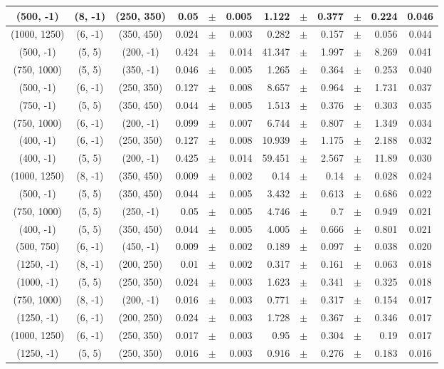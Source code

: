 \documentclass[12pt]{paper}
\begin{document}
\begin{table}[ht]
\begin{center}
{\begin{tabular}{|c|c|c|rrr|rrrrr|c|}
(500, -1)&(8, -1)&(250, 350)&0.05&$\pm$&0.005&1.122&$\pm$&0.377&$\pm$&0.224&0.046\\\hline
(1000, 1250)&(6, -1)&(350, 450)&0.024&$\pm$&0.003&0.282&$\pm$&0.157&$\pm$&0.056&0.044\\\hline
(500, -1)&(5, 5)&(200, -1)&0.424&$\pm$&0.014&41.347&$\pm$&1.997&$\pm$&8.269&0.041\\\hline
(750, 1000)&(5, 5)&(350, -1)&0.046&$\pm$&0.005&1.265&$\pm$&0.364&$\pm$&0.253&0.040\\\hline
(500, -1)&(6, -1)&(250, 350)&0.127&$\pm$&0.008&8.657&$\pm$&0.964&$\pm$&1.731&0.037\\\hline
(750, -1)&(5, 5)&(350, 450)&0.044&$\pm$&0.005&1.513&$\pm$&0.376&$\pm$&0.303&0.035\\\hline
(750, 1000)&(6, -1)&(200, -1)&0.099&$\pm$&0.007&6.744&$\pm$&0.807&$\pm$&1.349&0.034\\\hline
(400, -1)&(6, -1)&(250, 350)&0.127&$\pm$&0.008&10.939&$\pm$&1.175&$\pm$&2.188&0.032\\\hline
(400, -1)&(5, 5)&(200, -1)&0.425&$\pm$&0.014&59.451&$\pm$&2.567&$\pm$&11.89&0.030\\\hline
(1000, 1250)&(8, -1)&(350, 450)&0.009&$\pm$&0.002&0.14&$\pm$&0.14&$\pm$&0.028&0.024\\\hline
(500, -1)&(5, 5)&(350, 450)&0.044&$\pm$&0.005&3.432&$\pm$&0.613&$\pm$&0.686&0.022\\\hline
(750, 1000)&(5, 5)&(250, -1)&0.05&$\pm$&0.005&4.746&$\pm$&0.7&$\pm$&0.949&0.021\\\hline
(400, -1)&(5, 5)&(350, 450)&0.044&$\pm$&0.005&4.005&$\pm$&0.666&$\pm$&0.801&0.021\\\hline
(500, 750)&(6, -1)&(450, -1)&0.009&$\pm$&0.002&0.189&$\pm$&0.097&$\pm$&0.038&0.020\\\hline
(1250, -1)&(8, -1)&(200, 250)&0.01&$\pm$&0.002&0.317&$\pm$&0.161&$\pm$&0.063&0.018\\\hline
(1000, -1)&(5, 5)&(250, 350)&0.024&$\pm$&0.003&1.623&$\pm$&0.341&$\pm$&0.325&0.018\\\hline
(750, 1000)&(8, -1)&(200, -1)&0.016&$\pm$&0.003&0.771&$\pm$&0.317&$\pm$&0.154&0.017\\\hline
(1250, -1)&(6, -1)&(200, 250)&0.024&$\pm$&0.003&1.728&$\pm$&0.367&$\pm$&0.346&0.017\\\hline
(1000, 1250)&(6, -1)&(250, 350)&0.017&$\pm$&0.003&0.95&$\pm$&0.304&$\pm$&0.19&0.017\\\hline
(1250, -1)&(5, 5)&(250, 350)&0.016&$\pm$&0.003&0.916&$\pm$&0.276&$\pm$&0.183&0.016\\\hline

\end{tabular}}
\end{center}
\end{table}
\end{document}
